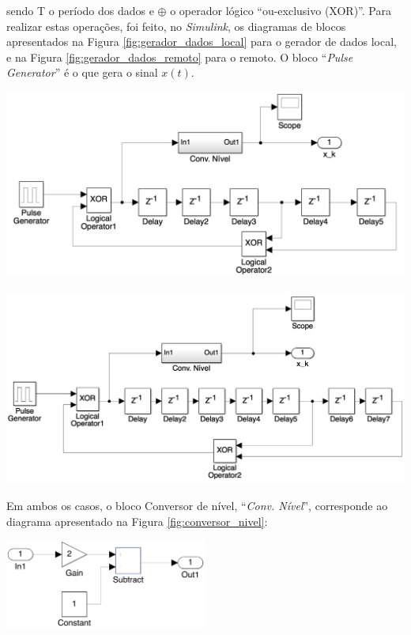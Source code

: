 \documentclass[a4paper,11pt]{report}
\begin{document}
sendo T o período dos dados e $\oplus$ o operador lógico ``ou-exclusivo (XOR)''. Para realizar estas operações, foi feito, no \textit{Simulink}, os diagramas de blocos apresentados na Figura \ref{fig:gerador_dados_local} para o gerador de dados local, e na Figura \ref{fig:gerador_dados_remoto} para o remoto. O bloco ``\textit{Pulse Generator}'' é o que gera o sinal $x(t)$.

\begin{center}
     \includegraphics[angle=0,width=1.0\textwidth]{gerador_dados_local.png}
     \label{fig:gerador_dados_local}
\end{center}

\begin{center}
     \includegraphics[angle=0,width=1.0\textwidth]{gerador_dados_remoto.png}
     \label{fig:gerador_dados_remoto}
\end{center}

Em ambos os casos, o bloco Conversor de nível, ``\textit{Conv. Nível}'', corresponde ao diagrama apresentado na Figura \ref{fig:conversor_nivel}:

\begin{center}
     \includegraphics[angle=0,width=0.5\textwidth]{conversor_nivel.png}
     \label{fig:conversor_nivel}
\end{center}
\end{document}

